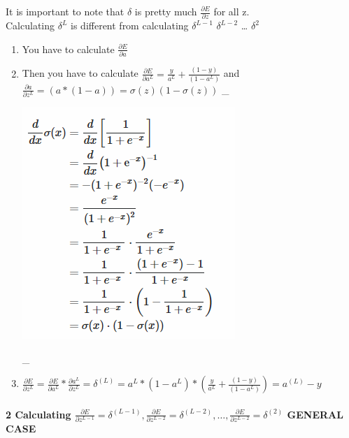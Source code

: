 It is important to note that \(\delta\) is pretty much
\(\frac{\partial E}{\partial z}\) for all z.\\
Calculating \(\delta^{L}\) is different from calculating
\(\delta^{L-1}\) \(\delta^{L-2}\) \ldots{} \(\delta^{2}\)

\begin{enumerate}
\def\labelenumi{\arabic{enumi}.}
\item
  You have to calculate \(\frac{\partial E}{\partial a}\)
\item
  Then you have to calculate
  \(\frac{\partial E}{\partial a^{L}} = \frac{y}{a^{L}}+\frac{(1-y)}{(1-a^{L})}\)
  and
  \(\frac{\partial a}{\partial z^{L}}=(a*(1-a))=\sigma(z)(1-\sigma(z))\)
  \_

  \includegraphics{sigmoidDerivative.png}

  \_
\item
  \(\frac{\partial E}{\partial z^{L}}=\frac{\partial E}{\partial a^{L}}* \frac{\partial a^{L}}{\partial z^{L}}= \delta^{(L)} = a^{L}* (1-a^{L})* (\frac{y}{a^{L}}+\frac{(1-y)}{(1-a^{L})})=a^{(L)} - y\)
\end{enumerate}

\paragraph{\texorpdfstring{2 Calculating
\(\frac{\partial E}{\partial z^{L-1}}=\delta^{(L-1)}, \frac{\partial E}{\partial z^{L-2}}=\delta^{(L-2)},\dots, \frac{\partial E}{\partial z^{L-2}}=\delta^{(2)}\)
GENERAL
CASE}{2 Calculating \textbackslash{}frac\{\textbackslash{}partial E\}\{\textbackslash{}partial z\^{}\{L-1\}\}=\textbackslash{}delta\^{}\{(L-1)\}, \textbackslash{}frac\{\textbackslash{}partial E\}\{\textbackslash{}partial z\^{}\{L-2\}\}=\textbackslash{}delta\^{}\{(L-2)\},\textbackslash{}dots, \textbackslash{}frac\{\textbackslash{}partial E\}\{\textbackslash{}partial z\^{}\{L-2\}\}=\textbackslash{}delta\^{}\{(2)\} GENERAL CASE}}\label{calculating-fracpartial-epartial-zl-1deltal-1-fracpartial-epartial-zl-2deltal-2dots-fracpartial-epartial-zl-2delta2-general-case}

